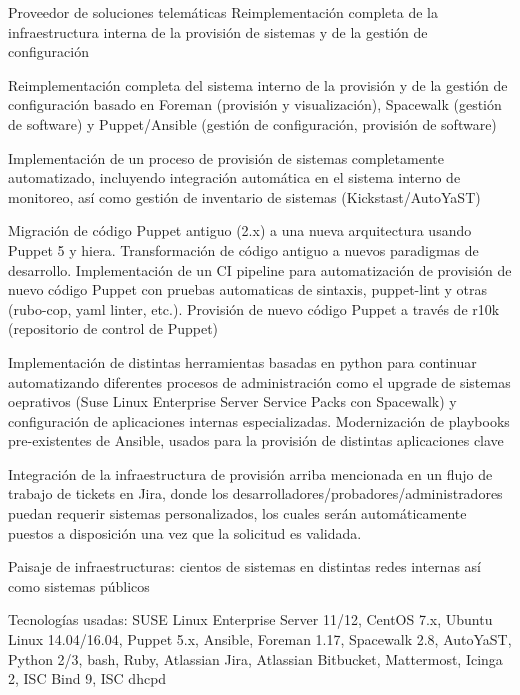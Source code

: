 

\begin{cventries}
  \cventry
    {Proveedor de soluciones telemáticas}
    {Reimplementación completa de la infraestructura interna de la provisión de sistemas y de la gestión de configuración}
    {}
    {}
    {
      \begin{cvitems}
      \item Reimplementación completa del sistema interno de la provisión y de la gestión de configuración basado en Foreman (provisión y visualización), Spacewalk (gestión de software) y Puppet/Ansible (gestión de configuración, provisión de software)
 \item Implementación de un proceso de provisión de sistemas completamente automatizado, incluyendo integración automática en el sistema interno de monitoreo, así como gestión de inventario de sistemas (Kickstast/AutoYaST)
 \item Migración de código Puppet antiguo (2.x) a una nueva arquitectura usando Puppet 5 y hiera.
  Transformación de código antiguo a nuevos paradigmas de desarrollo. Implementación de un CI
  pipeline para automatización de provisión de nuevo código Puppet con pruebas automaticas de
  sintaxis, puppet-lint y otras (rubo-cop, yaml linter, etc.). Provisión de nuevo código Puppet a través de r10k (repositorio de control de Puppet)
\item Implementación de distintas herramientas basadas en python para continuar automatizando diferentes
  procesos de administración como el upgrade de sistemas oeprativos (Suse Linux Enterprise Server
  Service Packs con Spacewalk) y configuración de aplicaciones internas especializadas.
  Modernización de playbooks pre-existentes de Ansible, usados para la provisión de distintas aplicaciones clave
\item Integración de la infraestructura de provisión arriba mencionada en un flujo de trabajo de tickets en Jira,
  donde los desarrolladores/probadores/administradores puedan requerir sistemas personalizados,
  los cuales serán automáticamente puestos a disposición una vez que la solicitud es validada.
 \item Paisaje de infraestructuras: cientos de sistemas en distintas redes internas así como sistemas públicos
 \item Tecnologías usadas: SUSE Linux Enterprise Server 11/12, CentOS 7.x, Ubuntu Linux 14.04/16.04, Puppet 5.x, Ansible, Foreman 1.17, Spacewalk 2.8, AutoYaST, Python 2/3, bash, Ruby, Atlassian Jira, Atlassian Bitbucket, Mattermost, Icinga 2, ISC Bind 9, ISC dhcpd
      \end{cvitems}
    }


\end{cventries}
